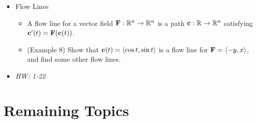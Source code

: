 \documentclass[11pt]{article}
\begin{document}
\begin{itemize}
\begin{itemize}
    \end{itemize}
  \item Flow Lines
    \begin{itemize}
      \item A flow line for a vector field \(\mathbf{F}:\mathbb R^n\to\mathbb R^n\)
        is a path \(\mathbf{c}:\mathbb R\to\mathbb R^n\) satisfying
        \(\mathbf{c}'(t)=\mathbf{F}(\mathbf{c}(t))\).
      \item (Example 8) Show that \(\mathbf{c}(t)=\langle\cos t,\sin t\rangle\) is a flow
        line for \(\mathbf{F}=\langle-y,x\rangle\), and find some other flow lines.
    \end{itemize}
  \item\textit{
    HW: 1-22
  }
\end{itemize}


\section*{Remaining Topics}
\end{document}
